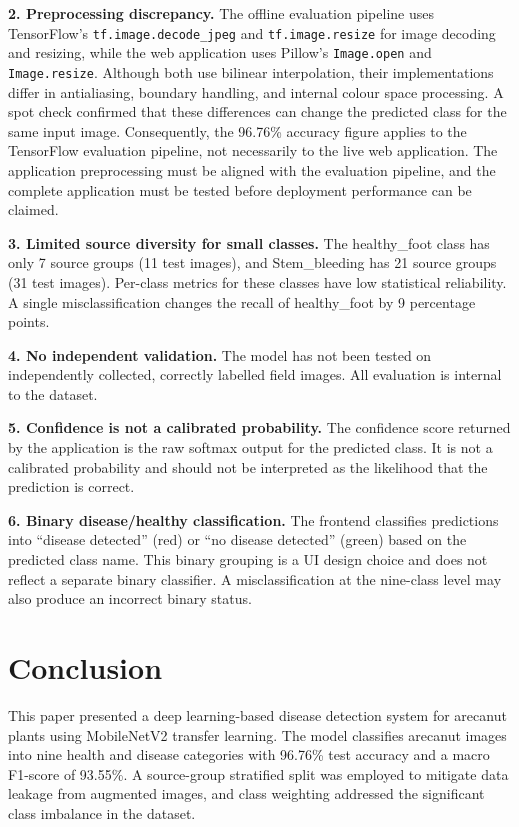 \documentclass[conference]{IEEEtran}
\begin{document}
\textbf{2. Preprocessing discrepancy.} The offline evaluation pipeline uses TensorFlow's \texttt{tf.image.decode\_jpeg} and \texttt{tf.image.resize} for image decoding and resizing, while the web application uses Pillow's \texttt{Image.open} and \texttt{Image.resize}. Although both use bilinear interpolation, their implementations differ in antialiasing, boundary handling, and internal colour space processing. A spot check confirmed that these differences can change the predicted class for the same input image. Consequently, the 96.76\% accuracy figure applies to the TensorFlow evaluation pipeline, not necessarily to the live web application. The application preprocessing must be aligned with the evaluation pipeline, and the complete application must be tested before deployment performance can be claimed.

\textbf{3. Limited source diversity for small classes.} The healthy\_foot class has only 7 source groups (11 test images), and Stem\_bleeding has 21 source groups (31 test images). Per-class metrics for these classes have low statistical reliability. A single misclassification changes the recall of healthy\_foot by 9 percentage points.

\textbf{4. No independent validation.} The model has not been tested on independently collected, correctly labelled field images. All evaluation is internal to the dataset.

\textbf{5. Confidence is not a calibrated probability.} The confidence score returned by the application is the raw softmax output for the predicted class. It is not a calibrated probability and should not be interpreted as the likelihood that the prediction is correct.

\textbf{6. Binary disease/healthy classification.} The frontend classifies predictions into ``disease detected'' (red) or ``no disease detected'' (green) based on the predicted class name. This binary grouping is a UI design choice and does not reflect a separate binary classifier. A misclassification at the nine-class level may also produce an incorrect binary status.

\section{Conclusion}
\label{sec:conclusion}

This paper presented a deep learning-based disease detection system for arecanut plants using MobileNetV2 transfer learning. The model classifies arecanut images into nine health and disease categories with 96.76\% test accuracy and a macro F1-score of 93.55\%. A source-group stratified split was employed to mitigate data leakage from augmented images, and class weighting addressed the significant class imbalance in the dataset.
\end{document}
